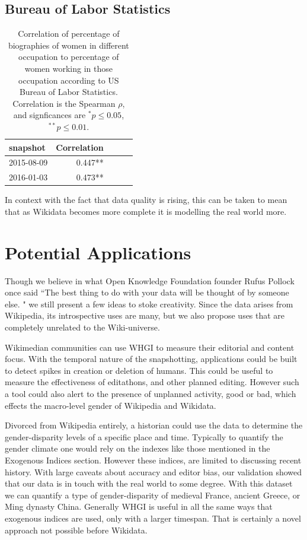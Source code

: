 \documentclass[letterpaper]{article}
\begin{document}
\subsection{Bureau of Labor Statistics}

\begin{table}
\caption{Correlation of percentage of biographies of women in different
occupation to percentage of women working in those occupation according to US
Bureau of Labor Statistics. Correlation is the Spearman $\rho$, and signficances are $ ^*p\leq 0.05 $, $ ^{**}p\leq 0.01$.}
\label{table:scores}
\begin{tabular}{lrrrr}
\toprule
snapshot &  Correlation \\
\midrule
2015-08-09 & 0.447**  \\
2016-01-03 & 0.473**  \\
\bottomrule
\end{tabular}
\end{table}

 In context with the fact that data quality is rising, this can be taken to mean that as Wikidata becomes more complete it is modelling the real world more. 

\section{Potential Applications}
Though we believe in what Open Knowledge Foundation founder Rufus Pollock once said ``The best thing to do with your data will be thought of by someone else. " we still present a few ideas to stoke creativity. Since the data arises from Wikipedia, its introspective uses are many, but we also propose uses that are completely unrelated to the Wiki-universe. 

Wikimedian communities can use WHGI to measure their editorial and content focus. With the temporal nature of the snapshotting, applications could be built to detect spikes in creation or deletion of humans. This could be useful to measure the effectiveness of editathons, and other planned editing. However such a tool could also alert to the presence of unplanned activity, good or bad, which effects the macro-level gender of Wikipedia and Wikidata.

Divorced from Wikipedia entirely, a historian could use the data to determine the gender-disparity levels of a specific place and time. Typically to quantify the gender climate one would rely on the indexes like those mentioned in the Exogenous Indices section. However these indices, are limited to discussing recent history. With large caveats about accuracy and editor bias, our validation showed that our data is in touch with the real world to some degree. With this dataset we can quantify a type of gender-disparity of medieval France, ancient Greece, or Ming dynasty China. Generally WHGI is useful in all the same ways that exogenous indices are used, only with a larger timespan. That is certainly a novel approach not possible before Wikidata.
\end{document}

